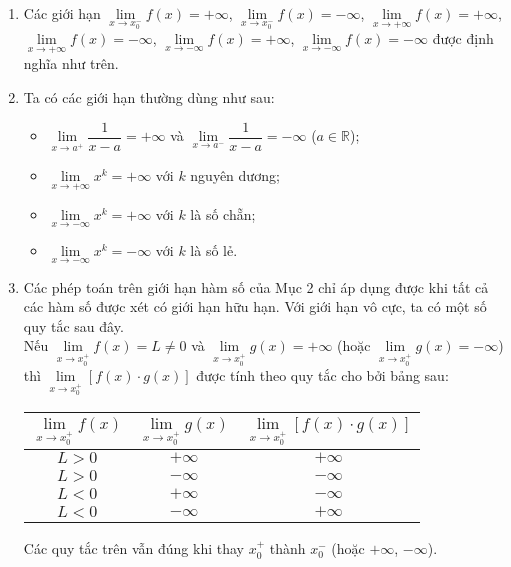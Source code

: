 \begin{tomtat}
\begin{note}
	\begin{enumerate}
		\item Các giới hạn $ \lim \limits_{x \to x_0^-} f(x)=+\infty $, $ \lim \limits_{x \to x_0^-} f(x)=-\infty $, $ \lim \limits_{x \to +\infty} f(x)=+\infty $, $ \lim \limits_{x \to +\infty} f(x)=-\infty $, $ \lim \limits_{x \to -\infty} f(x)=+\infty $, $ \lim \limits_{x \to -\infty} f(x)=-\infty $ được định nghĩa như trên.
		\item Ta có các giới hạn thường dùng như sau:
		\begin{itemize}
			\item $ \lim \limits_{x \to a^+} \dfrac{1}{x-a}=+\infty $ và $ \lim \limits_{x \to a^-}\dfrac{1}{x-a}=-\infty $ ($ a\in \mathbb{R} $);
			\item $ \lim \limits_{x \to +\infty}x^k=+\infty $ với $ k $ nguyên dương;
			\item $ \lim \limits_{x \to -\infty}x^k=+\infty $ với $ k $ là số chẵn;
			\item $ \lim \limits_{x \to -\infty}x^k=-\infty $ với $ k $ là số lẻ.
		\end{itemize}
		\item Các phép toán trên giới hạn hàm số của Mục 2 chỉ áp dụng được khi tất cả các hàm số được xét có giới hạn hữu hạn. Với giới hạn vô cực, ta có một số quy tắc sau đây.\\
		Nếu $ \lim \limits_{x \to x_0^+} f(x)=L\neq 0 $ và $ \lim \limits_{x \to x_0^+} g(x)=+\infty $ (hoặc $ \lim \limits_{x \to x_0^+} g(x)=-\infty $) thì $ \lim \limits_{x \to x_0^+}[f(x)\cdot g(x)] $ được tính theo quy tắc cho bởi bảng sau:
		\begin{center}
			\begin{tabular}{|c|c|c|}
				\hline 
				$ \lim \limits_{x \to x_0^+} f(x) $	& $  \lim \limits_{x \to x_0^+} g(x) $&$ \lim \limits_{x \to x_0^+} [f(x)\cdot g(x)] $  \\ 
				\hline 
				$ L>0 $	&$ +\infty $  &$ +\infty $  \\ 
				\hline 
				$ L>0 $	&$ -\infty $ &$ -\infty $  \\ 
				\hline 
				$ L<0 $&  $ +\infty $&  $ -\infty $\\ 
				\hline 
				$ L<0 $& $ -\infty $ &$ +\infty $  \\ 
				\hline 
			\end{tabular} 
		\end{center}
		Các quy tắc trên vẫn đúng khi thay $ x_0^+ $ thành $ x_0^- $ (hoặc $ +\infty $, $ -\infty $).
	\end{enumerate}
\end{note}
\end{tomtat}

